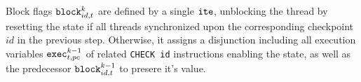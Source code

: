 

\noindent
Block flags $\texttt{block}^k_{id, t}$ are defined by a single $\texttt{ite}$, unblocking the thread by resetting the state if all threads synchronized upon the corresponding checkpoint $id$ in the previous step. %
Otherwise, it assigns a disjunction including all execution variables $\texttt{exec}^{k - 1}_{t, pc}$ of related \lstinline[language={[concubine]Assembler}]{CHECK id} instructions enabling the state, as well as the predecessor $\texttt{block}^{k - 1}_{id, t}$ to presere it's value.


